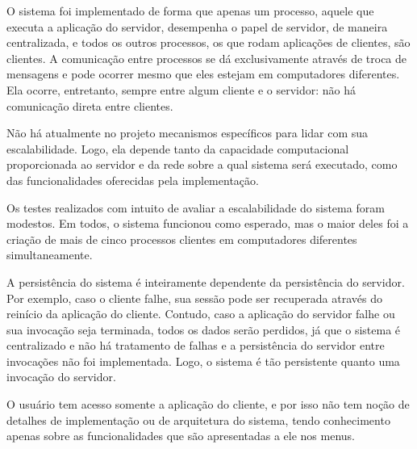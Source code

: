 \documentclass[../main.tex]{subfiles}
\begin{document}
O sistema foi implementado de forma que apenas um processo, aquele que executa a aplicação do servidor, desempenha o papel de servidor, de maneira centralizada, e todos os outros processos, os que rodam aplicações de clientes, são clientes.
A comunicação entre processos se dá exclusivamente através de troca de mensagens e pode ocorrer mesmo que eles estejam em computadores diferentes.
Ela ocorre, entretanto, sempre entre algum cliente e o servidor: não há comunicação direta entre clientes.

Não há atualmente no projeto mecanismos específicos para lidar com sua escalabilidade.
Logo, ela depende tanto da capacidade computacional proporcionada ao servidor e da rede sobre a qual sistema será executado, como das funcionalidades oferecidas pela implementação.

Os testes realizados com intuito de avaliar a escalabilidade do sistema foram modestos.
Em todos, o sistema funcionou como esperado, mas o maior deles foi a criação de mais de cinco processos clientes em computadores diferentes simultaneamente.

A persistência do sistema é inteiramente dependente da persistência do servidor.
Por exemplo, caso o cliente falhe, sua sessão pode ser recuperada através do reinício da aplicação do cliente.
Contudo, caso a aplicação do servidor falhe ou sua invocação seja terminada, todos os dados serão perdidos, já que o sistema é centralizado e não há tratamento de falhas e a persistência do servidor entre invocações não foi implementada.
Logo, o sistema é tão persistente quanto uma invocação do servidor.

O usuário tem acesso somente a aplicação do cliente, e por isso não tem noção de detalhes de implementação ou de arquitetura do sistema, tendo conhecimento apenas sobre as funcionalidades que são apresentadas a ele nos menus.
\end{document}
